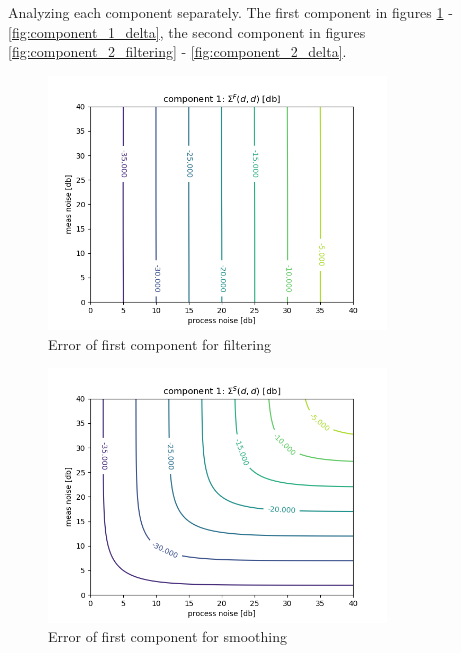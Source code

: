 \documentclass[oneside,12pt]{article}
\begin{document}
%
Analyzing each component separately. The first component in figures \ref{fig:component_1_filtering} - \ref{fig:component_1_delta}, the second component in figures \ref{fig:component_2_filtering} - \ref{fig:component_2_delta}.
%
%
\begin{figure}
    \centering
        \includegraphics[width=0.8\textwidth]{./component_1_filtering}
        \caption{\label{fig:component_1_filtering}Error of first component for filtering}
\end{figure}
%
%
\begin{figure}
    \centering
        \includegraphics[width=0.8\textwidth]{./component_1_smoothing}
        \caption{\label{fig:component_1_smoothing}Error of first component for smoothing}
\end{figure}
%
%
\end{document}
